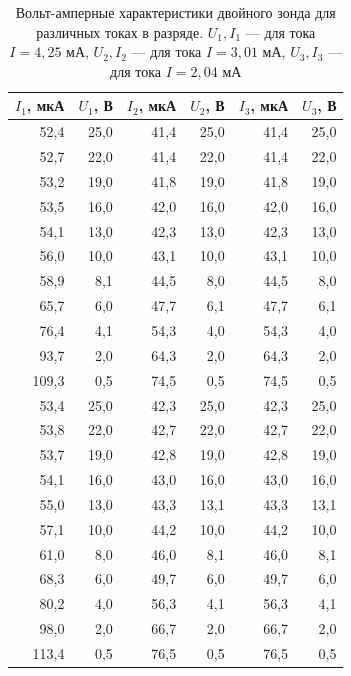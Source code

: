 \documentclass[12pt]{article}
\begin{document}
\begin{table}
	\centering
	\begin{tabular}{|r|r|r|r|r|r|}
		\hline
		$I_1$, мкА & $U_1$, В & $I_2$, мкА & $U_2$, В & $I_3$, мкА & $U_3$, В \\ \hline
		52,4       & 25,0     & 41,4       & 25,0     & 41,4       & 25,0     \\ \hline
		52,7       & 22,0     & 41,4       & 22,0     & 41,4       & 22,0     \\ \hline
		53,2       & 19,0     & 41,8       & 19,0     & 41,8       & 19,0     \\ \hline
		53,5       & 16,0     & 42,0       & 16,0     & 42,0       & 16,0     \\ \hline
		54,1       & 13,0     & 42,3       & 13,0     & 42,3       & 13,0     \\ \hline
		56,0       & 10,0     & 43,1       & 10,0     & 43,1       & 10,0     \\ \hline
		58,9       & 8,1      & 44,5       & 8,0      & 44,5       & 8,0      \\ \hline
		65,7       & 6,0      & 47,7       & 6,1      & 47,7       & 6,1      \\ \hline
		76,4       & 4,1      & 54,3       & 4,0      & 54,3       & 4,0      \\ \hline
		93,7       & 2,0      & 64,3       & 2,0      & 64,3       & 2,0      \\ \hline
		109,3      & 0,5      & 74,5       & 0,5      & 74,5       & 0,5      \\ \hline
		53,4       & 25,0     & 42,3       & 25,0     & 42,3       & 25,0     \\ \hline
		53,8       & 22,0     & 42,7       & 22,0     & 42,7       & 22,0     \\ \hline
		53,7       & 19,0     & 42,8       & 19,0     & 42,8       & 19,0     \\ \hline
		54,1       & 16,0     & 43,0       & 16,0     & 43,0       & 16,0     \\ \hline
		55,0       & 13,0     & 43,3       & 13,1     & 43,3       & 13,1     \\ \hline
		57,1       & 10,0     & 44,2       & 10,0     & 44,2       & 10,0     \\ \hline
		61,0       & 8,0      & 46,0       & 8,1      & 46,0       & 8,1      \\ \hline
		68,3       & 6,0      & 49,7       & 6,0      & 49,7       & 6,0      \\ \hline
		80,2       & 4,0      & 56,3       & 4,1      & 56,3       & 4,1      \\ \hline
		98,0       & 2,0      & 66,7       & 2,0      & 66,7       & 2,0      \\ \hline
		113,4      & 0,5      & 76,5       & 0,5      & 76,5       & 0,5      \\ \hline
	\end{tabular}
	\caption{Вольт-амперные характеристики двойного зонда для различных токах 
    в разряде. $U_1, I_1$ --- для тока $I = 4,25$ мА, $U_2, I_2$ --- для тока $I = 3,01$ мА, 
    $U_3, I_3$ --- для тока $I = 2,04$ мА  }
	\label{tab:2}
\end{table}
\end{document}
